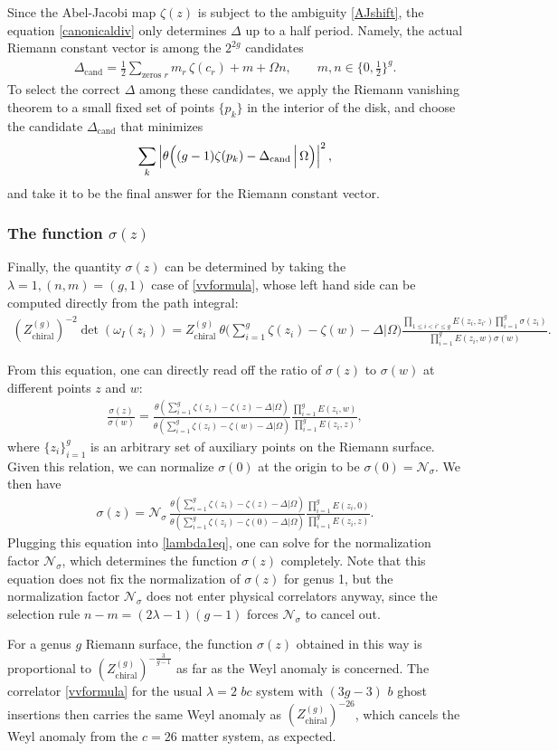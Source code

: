 \documentclass[12pt]{article}
\def\ie{\begin{equation}\begin{aligned}}
\def\fe{\end{aligned}\end{equation}}
\numberwithin{equation}{section}
\begin{document}
Since the Abel-Jacobi map $\zeta(z)$ is subject to the ambiguity \eqref{AJshift}, the equation \eqref{canonicaldiv} only determines $\Delta$ up to a half period. Namely, the actual Riemann constant vector is among the $2^{2g}$ candidates
\ie
\Delta_\text{cand}=\frac{1}{2}\sum_{\text{zeros }r}m_r\,\zeta(c_r)+m+\Omega n,\qquad m,n\in\{0,\tfrac12\}^g.
\fe
To select the correct $\Delta$ among these candidates, we apply the Riemann vanishing theorem to a small fixed set of points $\{p_k\}$ in the interior of the disk, and choose the candidate $\Delta_\text{cand}$ that minimizes
\ie
\sum_k \left|\theta\Bigl((g-1)\zeta(p_k)-\Delta_{\text{cand}}\,\Big|\,\Omega\Bigr)\right|^2,
\fe
and take it to be the final answer for the Riemann constant vector.

\subsubsection*{The function $\sigma(z)$}

Finally, the quantity $\sigma(z)$ can be determined by taking the $\lambda = 1, (n,m)=(g,1)$ case of \eqref{vvformula}, whose left hand side can be computed directly from the path integral:
\ie \label{lambda1eq}
(Z_\text{chiral}^{(g)})^{-2} \det(\omega_I(z_i)) = Z_\text{chiral}^{(g)}\ \theta\Big(\sum_{i=1}^g \zeta(z_i)-\zeta(w)-\Delta\Big|\Omega\Big) \frac{\prod_{1\leq i< i'\leq g}E(z_i, z_{i'})\prod_{i=1}^g\sigma(z_i)}{\prod_{i=1}^g E(z_i, w)\sigma(w)}.
\fe

From this equation, one can directly read off the ratio of $\sigma(z)$ to $\sigma(w)$ at different points $z$ and $w$:
\ie
\frac{\sigma(z)}{\sigma(w)} = \frac{\theta(\sum_{i=1}^g \zeta(z_i)-\zeta(z)-\Delta|\Omega)}{\theta(\sum_{i=1}^g \zeta(z_i)-\zeta(w)-\Delta|\Omega)} \frac{\prod_{i=1}^g E(z_i,w)}{\prod_{i=1}^g E(z_i,z)},
\fe
where $\{z_i\}_{i=1}^g$ is an arbitrary set of auxiliary points on the Riemann surface. Given this relation, we can normalize $\sigma(0)$ at the origin to be $\sigma(0)=\mathcal{N}_\sigma$. We then have 
\ie
\sigma(z) = \mathcal{N}_\sigma\, \frac{\theta(\sum_{i=1}^g \zeta(z_i)-\zeta(z)-\Delta|\Omega)}{\theta(\sum_{i=1}^g \zeta(z_i)-\zeta(0)-\Delta|\Omega)} \frac{\prod_{i=1}^g E(z_i,0)}{\prod_{i=1}^g E(z_i,z)}.
\fe
Plugging this equation into \eqref{lambda1eq}, one can solve for the normalization factor $\mathcal{N}_\sigma$, which determines the function $\sigma(z)$ completely. Note that this equation does not fix the normalization of $\sigma(z)$ for genus 1, but the normalization factor $\mathcal{N}_\sigma$ does not enter physical correlators anyway, since the selection rule $n-m=(2\lambda-1)(g-1)$ forces $\mathcal{N}_\sigma$ to cancel out.

For a genus $g$ Riemann surface, the function $\sigma(z)$ obtained in this way is proportional to $(Z_\text{chiral}^{(g)})^{-\frac{3}{g-1}}$ as far as the Weyl anomaly is concerned. The correlator \eqref{vvformula} for the usual $\lambda = 2$ $bc$ system with $(3g-3)$ $b$ ghost insertions then carries the same Weyl anomaly as $(Z_\text{chiral}^{(g)})^{-26}$, which cancels the Weyl anomaly from the $c=26$ matter system, as expected.


\printbibliography
\end{document}
